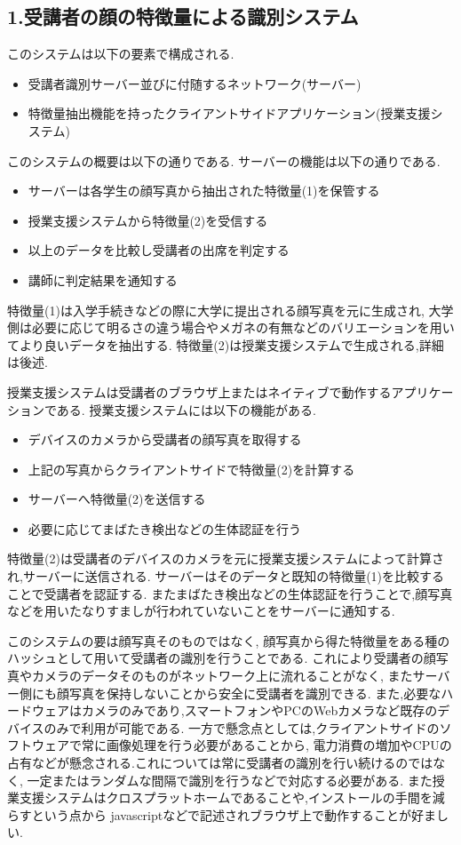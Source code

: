 \documentclass[uplatex,a4j,11pt,dvipdfmx]{jsarticle}
\begin{document}
\subsection*{1.受講者の顔の特徴量による識別システム}
このシステムは以下の要素で構成される.
\begin{itemize}
  \item 受講者識別サーバー並びに付随するネットワーク(サーバー)
  \item 特徴量抽出機能を持ったクライアントサイドアプリケーション(授業支援システム)
\end{itemize}
このシステムの概要は以下の通りである.
サーバーの機能は以下の通りである.
\begin{itemize}
  \item サーバーは各学生の顔写真から抽出された特徴量(1)を保管する
  \item 授業支援システムから特徴量(2)を受信する
  \item 以上のデータを比較し受講者の出席を判定する
  \item 講師に判定結果を通知する
\end{itemize}
特徴量(1)は入学手続きなどの際に大学に提出される顔写真を元に生成され,
大学側は必要に応じて明るさの違う場合やメガネの有無などのバリエーションを用いてより良いデータを抽出する.
特徴量(2)は授業支援システムで生成される,詳細は後述.

授業支援システムは受講者のブラウザ上またはネイティブで動作するアプリケーションである.
授業支援システムには以下の機能がある.
\begin{itemize}
  \item デバイスのカメラから受講者の顔写真を取得する
  \item 上記の写真からクライアントサイドで特徴量(2)を計算する
  \item サーバーへ特徴量(2)を送信する
  \item 必要に応じてまばたき検出などの生体認証を行う
\end{itemize}
特徴量(2)は受講者のデバイスのカメラを元に授業支援システムによって計算され,サーバーに送信される.
サーバーはそのデータと既知の特徴量(1)を比較することで受講者を認証する.
またまばたき検出などの生体認証を行うことで,顔写真などを用いたなりすましが行われていないことをサーバーに通知する.

このシステムの要は顔写真そのものではなく,
顔写真から得た特徴量をある種のハッシュとして用いて受講者の識別を行うことである.
これにより受講者の顔写真やカメラのデータそのものがネットワーク上に流れることがなく,
またサーバー側にも顔写真を保持しないことから安全に受講者を識別できる.
また,必要なハードウェアはカメラのみであり,スマートフォンやPCのWebカメラなど既存のデバイスのみで利用が可能である.
一方で懸念点としては,クライアントサイドのソフトウェアで常に画像処理を行う必要があることから,
電力消費の増加やCPUの占有などが懸念される.これについては常に受講者の識別を行い続けるのではなく,
一定またはランダムな間隔で識別を行うなどで対応する必要がある.
また授業支援システムはクロスプラットホームであることや,インストールの手間を減らすという点から
javascriptなどで記述されブラウザ上で動作することが好ましい.

\end{document}
